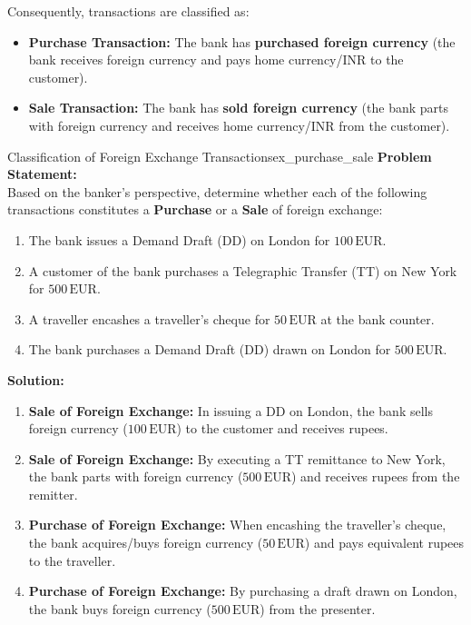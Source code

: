 \noindent Consequently, transactions are classified as:
\begin{itemize}[leftmargin=*]
    \item \textbf{Purchase Transaction:} The bank has \textbf{purchased foreign currency} (the bank receives foreign currency and pays home currency/INR to the customer).
    \item \textbf{Sale Transaction:} The bank has \textbf{sold foreign currency} (the bank parts with foreign currency and receives home currency/INR from the customer).
\end{itemize}

\begin{example}{Classification of Foreign Exchange Transactions}{ex_purchase_sale}
\textbf{Problem Statement:}\\
Based on the banker's perspective, determine whether each of the following transactions constitutes a \textbf{Purchase} or a \textbf{Sale} of foreign exchange:
\begin{enumerate}[leftmargin=*]
    \item The bank issues a Demand Draft (DD) on London for $100\,\text{EUR}$.
    \item A customer of the bank purchases a Telegraphic Transfer (TT) on New York for $500\,\text{EUR}$.
    \item A traveller encashes a traveller's cheque for $50\,\text{EUR}$ at the bank counter.
    \item The bank purchases a Demand Draft (DD) drawn on London for $500\,\text{EUR}$.
\end{enumerate}

\tcblower
\textbf{Solution:}
\begin{enumerate}[leftmargin=*]
    \item \textbf{Sale of Foreign Exchange:} In issuing a DD on London, the bank sells foreign currency ($100\,\text{EUR}$) to the customer and receives rupees.
    \item \textbf{Sale of Foreign Exchange:} By executing a TT remittance to New York, the bank parts with foreign currency ($500\,\text{EUR}$) and receives rupees from the remitter.
    \item \textbf{Purchase of Foreign Exchange:} When encashing the traveller's cheque, the bank acquires/buys foreign currency ($50\,\text{EUR}$) and pays equivalent rupees to the traveller.
    \item \textbf{Purchase of Foreign Exchange:} By purchasing a draft drawn on London, the bank buys foreign currency ($500\,\text{EUR}$) from the presenter.
\end{enumerate}
\end{example}

